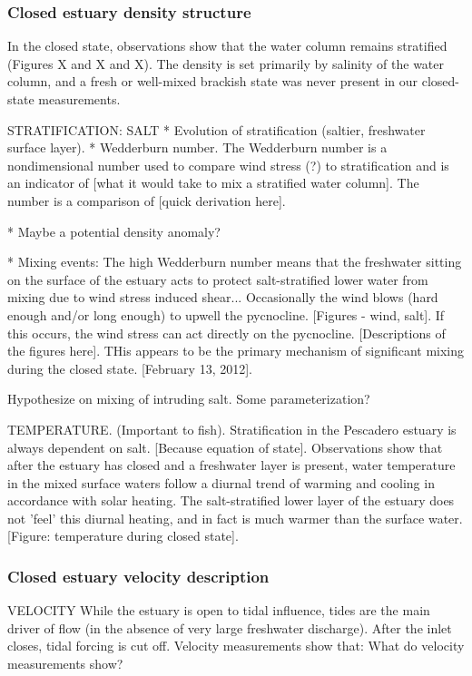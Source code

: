 

\subsubsection{Closed estuary density structure} \label{cl_strat}

In the closed state, observations show that the water column remains stratified (Figures X and X and X). The density is set primarily by salinity of the water column, and a fresh or well-mixed brackish state was never present in our closed-state measurements. 

STRATIFICATION: SALT * Evolution of stratification (saltier, freshwater
surface layer). * Wedderburn number. The Wedderburn number is a
nondimensional number used to compare wind stress (?) to stratification
and is an indicator of [what it would take to mix a stratified water
column]. The number is a comparison of [quick derivation here].


* Maybe a potential density anomaly?


* Mixing events: The high Wedderburn number means that the freshwater
sitting on the surface of the estuary acts to protect salt-stratified
lower water from mixing due to wind stress induced shear... Occasionally
the wind blows (hard enough and/or long enough) to upwell the
pycnocline. [Figures - wind, salt]. If this occurs, the wind stress can
act directly on the pycnocline. [Descriptions of the figures here]. 
THis appears to be the primary mechanism of significant mixing during
the closed state.  [February 13, 2012].



Hypothesize on mixing of intruding salt. Some parameterization?

TEMPERATURE. (Important to fish). Stratification in the Pescadero
estuary is always dependent on salt. [Because equation of state]. Observations show that after the estuary has closed and a freshwater layer is present, water temperature in the mixed surface
waters follow a diurnal trend of warming and cooling in accordance with
solar heating. The salt-stratified lower layer of the estuary does not
'feel' this diurnal heating, and in fact is much warmer than the surface
water. [Figure: temperature during closed state].




\subsubsection{Closed estuary velocity description} \label{cl_vel}
VELOCITY While the estuary is open to tidal influence, tides are the
main driver of flow (in the absence of very large freshwater discharge).
After the inlet closes, tidal forcing is cut off. Velocity measurements
show that: {What do velocity measurements show?}

